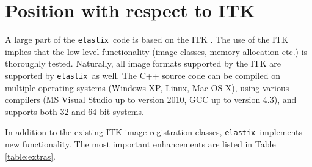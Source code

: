 \documentclass[]{report}
\newcommand{\elastix}{\texttt{elastix}}
\begin{document}
\section{Position with respect to ITK}

%
%

A large part of the \elastix\ code is based on the ITK
\cite{ITKSoftwareGuideSecondEdition}. The use of the ITK implies that the
low-level functionality (image classes, memory allocation etc.) is thoroughly
tested. Naturally, all image formats supported by the ITK are supported by
\elastix\ as well. The C++ source code can be compiled on multiple operating
systems (Windows XP, Linux, Mac OS X), using various compilers (MS Visual
Studio up to version 2010, GCC up to version 4.3), and supports both 32 and 64
bit systems.

In addition to the existing ITK image registration classes, \elastix\
implements new functionality. The most important enhancements are listed in
Table \ref{table:extras}.
\end{document}
